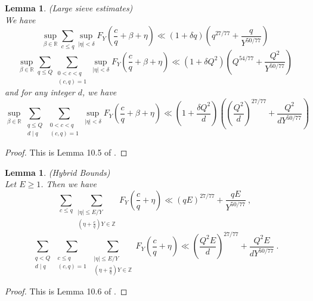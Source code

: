 \documentclass{amsart}
\newtheorem{lemma}[theorem]{Lemma}
\numberwithin{equation}{subsection}
\begin{document}
\begin{lemma}\label{lem54}(Large sieve estimates)\\
We have
$$\sup_{\beta\in\mathbb{R}} \sum_{c\leq q} \sup_{|\eta|<\delta} F_Y\left(\frac{c}{q}+\beta+\eta\right)\ll (1+\delta q)\left(q^{27/77}+\frac{q}{Y^{50/77}}\right)$$
$$\sup_{\beta\in\mathbb{R}} \sum_{q\leq Q}\sum_{\substack{0<c<q \\ (c,q)=1}} \sup_{|\eta|<\delta} F_Y\left(\frac{c}{q}+\beta+\eta\right)\ll (1+\delta Q^2)\left(Q^{54/77}+\frac{Q^2}{Y^{50/77}}\right)$$
and for any integer $d$, we have
$$\sup_{\beta\in\mathbb{R}} \sum_{\substack{q\leq Q \\ d\mid q}}\sum_{\substack{0<c<q \\ (c,q)=1}} \sup_{|\eta|<\delta} F_Y\left(\frac{c}{q}+\beta+\eta\right)\ll \left(1+\frac{\delta Q^2}{d}\right)\left(\left(\frac{Q^{2}}{d}\right)^{27/77}+\frac{Q^2}{dY^{50/77}}\right)$$
\end{lemma}
\begin{proof}
This is Lemma 10.5 of \cite{maynard}.
\end{proof}


\begin{lemma}\label{lem55}(Hybrid Bounds)\\
Let $E\geq 1$. Then we have
$$\sum_{c\leq q}\sum_{\substack{|\eta|\leq E/Y \\ \left(\eta+\frac{c}{q}\right)Y\in\mathbb{Z}}} F_Y\left(\frac{c}{q}+\eta\right)\ll (qE)^{27/77}+\frac{qE}{Y^{50/77}}\:,$$
$$\sum_{\substack{q<Q \\ d\mid q}}\sum_{\substack{c\leq q \\ (c,q)=1}}\sum_{\substack{|\eta|\leq E/Y \\ \left(\eta+\frac{a}{q}\right)Y\in\mathbb{Z}}} F_Y\left(\frac{c}{q}+\eta\right)\ll \left(\frac{Q^2E}{d}\right)^{27/77}+\frac{Q^2E}{dY^{50/77}}\:.$$
\end{lemma}

\begin{proof}
This is Lemma 10.6 of \cite{maynard}.
\end{proof}
\end{document}
